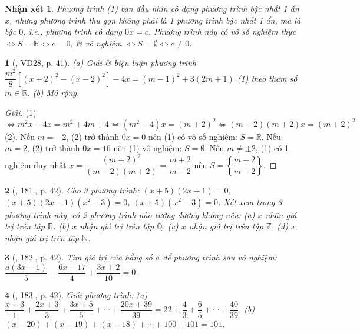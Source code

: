 \documentclass{article}
\newtheorem{baitoan}{}
\newtheorem{nhanxet}{Nhận xét}
\begin{document}
\begin{nhanxet}
	Phương trình (1) ban đầu nhìn có dạng phương trình bậc nhất 1 ẩn $x$, nhưng phương trình thu gọn không phải là 1 phương trình bậc nhất 1 ẩn, mà là bậc $0$, i.e., phương trình có dạng $0x = c$. Phương trình này có vô số nghiệm thực $\Leftrightarrow S = \mathbb{R}\Leftrightarrow c = 0$, \&  vô nghiệm $\Leftrightarrow S = \emptyset\Leftrightarrow c\ne0$.
\end{nhanxet}

\begin{baitoan}[\cite{Tuyen_Toan_8}, VD28, p. 41]
	(a) Giải \& biện luận phương trình $\dfrac{m^2}{8}\left[(x + 2)^2 - (x  - 2)^2\right] - 4x = (m - 1)^2 + 3(2m + 1)$ {\rm(1)} theo tham số $m\in\mathbb{R}$. (b) Mở rộng.
\end{baitoan}

\begin{proof}[Giải]
	(1) $\Leftrightarrow m^2x - 4x = m^2 + 4m + 4\Leftrightarrow(m^2 - 4)x = (m + 2)^2\Leftrightarrow(m - 2)(m + 2)x = (m + 2)^2$ (2). Nếu $m = -2$, (2) trở thành $0x = 0$ nên (1) có vô số nghiệm: $S = \mathbb{R}$. Nếu $m = 2$, (2) trở thành $0x = 16$ nên (1) vô nghiệm: $S = \emptyset$. Nếu $m\ne\pm2$, (1) có 1 nghiệm duy nhất $x = \dfrac{(m + 2)^2}{(m - 2)(m + 2)} = \dfrac{m + 2}{m - 2}$ nên $S = \left\{\dfrac{m + 2}{m - 2}\right\}$.
\end{proof}

\begin{baitoan}[\cite{Tuyen_Toan_8}, 181., p. 42]
	Cho 3 phương trình: $(x + 5)(2x - 1) = 0$, $(x + 5)(2x - 1)(x^2 - 3) = 0$, $(x + 5)(x^2 - 3) = 0$. Xét xem trong 3 phương trình này, có 2 phương trình nào tương đương không nếu: (a) $x$ nhận giá trị trên tập $\mathbb{R}$. (b) $x$ nhận giá trị trên tập $\mathbb{Q}$. (c) $x$ nhận giá trị trên tập $\mathbb{Z}$. (d) $x$ nhận giá trị trên tập $\mathbb{N}$.
\end{baitoan}

\begin{baitoan}[\cite{Tuyen_Toan_8}, 182., p. 42]
	Tìm giá trị của hằng số $a$ để phương trình sau vô nghiệm: $\dfrac{a(3x - 1)}{5} - \dfrac{6x - 17}{4} + \dfrac{3x + 2}{10} = 0$.
\end{baitoan}

\begin{baitoan}[\cite{Tuyen_Toan_8}, 183., p. 42]
	Giải phương trình: (a) $\dfrac{x + 3}{1} + \dfrac{2x + 3}{3} + \dfrac{3x + 5}{5} + \cdots + \dfrac{20x + 39}{39} = 22 + \dfrac{4}{3} + \dfrac{6}{5} + \cdots + \dfrac{40}{39}$. (b) $(x - 20) + (x - 19) + (x - 18) + \cdots + 100 + 101 = 101$.
\end{baitoan}
\end{document}
